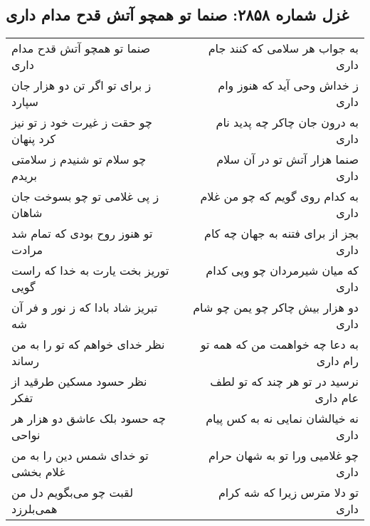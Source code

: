 \begin{center}
\section*{غزل شماره ۲۸۵۸: صنما تو همچو آتش قدح مدام داری}
\label{sec:2858}
\begin{longtable}{l p{0.5cm} r}
صنما تو همچو آتش قدح مدام داری
&&
به جواب هر سلامی که کنند جام داری
\\
ز برای تو اگر تن دو هزار جان سپارد
&&
ز خداش وحی آید که هنوز وام داری
\\
چو حقت ز غیرت خود ز تو نیز کرد پنهان
&&
به درون جان چاکر چه پدید نام داری
\\
چو سلام تو شنیدم ز سلامتی بریدم
&&
صنما هزار آتش تو در آن سلام داری
\\
ز پی غلامی تو چو بسوخت جان شاهان
&&
به کدام روی گویم که چو من غلام داری
\\
تو هنوز روح بودی که تمام شد مرادت
&&
بجز از برای فتنه به جهان چه کام داری
\\
توریز بخت یارت به خدا که راست گویی
&&
که میان شیرمردان چو ویی کدام داری
\\
تبریز شاد بادا که ز نور و فر آن شه
&&
دو هزار بیش چاکر چو یمن چو شام داری
\\
نظر خدای خواهم که تو را به من رساند
&&
به دعا چه خواهمت من که همه تو رام داری
\\
نظر حسود مسکین طرقید از تفکر
&&
نرسید در تو هر چند که تو لطف عام داری
\\
چه حسود بلک عاشق دو هزار هر نواحی
&&
نه خیالشان نمایی نه به کس پیام داری
\\
تو خدای شمس دین را به من غلام بخشی
&&
چو غلامیی ورا تو به شهان حرام داری
\\
لقبت چو می‌بگویم دل من همی‌بلرزد
&&
تو دلا مترس زیرا که شه کرام داری
\\
\end{longtable}
\end{center}
